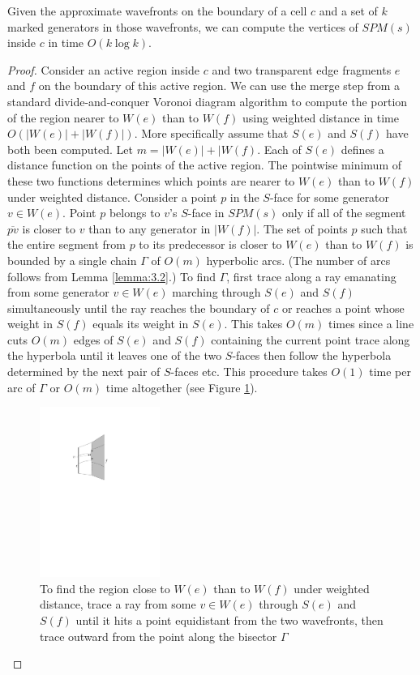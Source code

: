 \begin{Lemma} \label{lemma:4.12} 
	Given the approximate wavefronts on the boundary of a cell $c$ and a set of
	$k$ marked generators in those wavefronts, we can compute the vertices of
	$SPM(s)$ inside $c$ in time $O(k\log k)$.
\end{Lemma}
\begin{proof}
	Consider an active region inside $c$ and two transparent edge fragments $e$
	and $f$ on the boundary of this active region. We can use the merge step
	from a standard divide-and-conquer Voronoi diagram algorithm to compute the
	portion of the region nearer to $W(e)$ than to $W(f)$ using weighted
	distance in time $O(|W(e)|+|W(f)|)$. More specifically assume that $S(e)$
	and $S(f)$ have both been computed. Let $m=|W(e)|+|W(f)$. Each of $S(e)$
	defines a distance function on the points of the active region. The
	pointwise minimum of these two functions determines which points are nearer
	to $W(e)$ than to $W(f)$ under weighted distance. Consider a point $p$ in
	the $S$-face for some generator $v\in W(e)$. Point $p$ belongs to $v$'s
	$S$-face in $SPM(s)$ only if all of the segment $\overline{pv}$ is closer to
	$v$ than to any generator in $|W(f)|$. The set of  points $p$ such that the
	entire segment from $p$ to its predecessor is closer to $W(e)$ than to
	$W(f)$ is bounded by a single chain $\Gamma$ of $O(m)$ hyperbolic arcs. (The
	number of arcs follows from Lemma \ref{lemma:3.2}.) To find $\Gamma$, first trace along
	a ray emanating from some generator $v \in W(e)$ marching through $S(e)$ and
	$S(f)$ simultaneously until the ray reaches the boundary of $c$ or reaches a
	point whose weight in $S(f)$ equals its weight in $S(e)$. This takes $O(m)$
	times since a line cuts $O(m)$ edges of $S(e)$ and $S(f)$ containing the
	current point trace along the hyperbola until it leaves one of the two
	$S$-faces then follow the hyperbola determined by the next pair of $S$-faces
	etc. This procedure takes $O(1)$ time per arc of $\Gamma$ or $O(m)$ time
	altogether (see Figure \ref{fig:traceray}). 
    
\begin{figure}[H]
	\centering
	\includegraphics[width=0.35\textwidth]{figures/traceray.pdf}
	\caption{To find the region close to $W(e)$ than to $W(f)$ under weighted distance, 
    		 trace a ray from some $v \in W(e)$ through $S(e)$ and $S(f)$ until it hits a point 
             equidistant from the two wavefronts, then trace outward from the point along the bisector 
             $\Gamma$}
	\label{fig:traceray}
\end{figure}
    

\end{proof}
